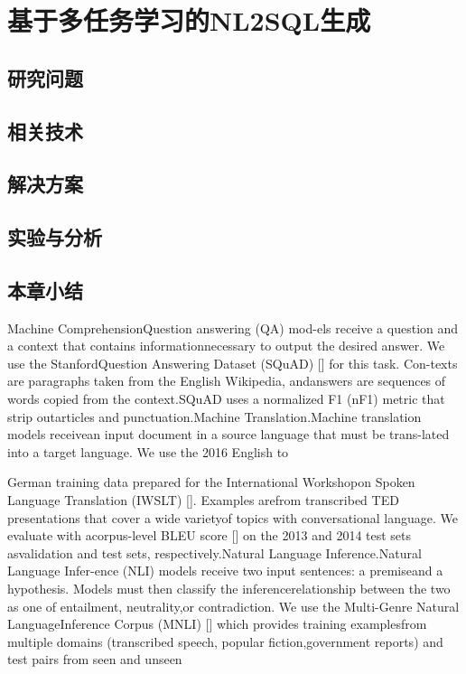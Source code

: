 
\chapter{基于多任务学习的NL2SQL生成}
\label{chap:cnl2sql}

\section{研究问题}
\section{相关技术}
\section{解决方案}
\section{实验与分析}
\section{本章小结}
Machine  ComprehensionQuestion answering (QA) mod-els receive a question and a context that contains informationnecessary  to  output  the  desired  answer.  We  use  the  StanfordQuestion  Answering  Dataset  (SQuAD)  []  for  this  task.  Con-texts  are  paragraphs  taken  from  the  English  Wikipedia,  andanswers  are  sequences  of  words  copied  from  the  context.SQuAD  uses  a  normalized  F1  (nF1)  metric  that  strip  outarticles and punctuation.Machine Translation.Machine translation models receivean  input  document  in  a  source  language  that  must  be  trans-lated  into  a  target  language.  We  use  the  2016  English  to

German training data prepared for the International Workshopon  Spoken  Language  Translation  (IWSLT)  [].  Examples  arefrom transcribed TED presentations that cover a wide varietyof  topics  with  conversational  language.  We  evaluate  with  acorpus-level BLEU score [] on the 2013 and 2014 test sets asvalidation and test sets, respectively.Natural  Language  Inference.Natural  Language  Infer-ence  (NLI)  models  receive  two  input  sentences:  a  premiseand  a  hypothesis.  Models  must  then  classify  the  inferencerelationship between the two as one of entailment, neutrality,or  contradiction.  We  use  the  Multi-Genre  Natural  LanguageInference Corpus (MNLI) [] which provides training examplesfrom  multiple  domains  (transcribed  speech,  popular  fiction,government  reports)  and  test  pairs  from  seen  and  unseen


